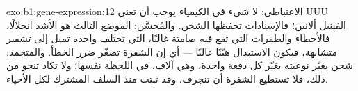 \begin{solution}{exo:b1:gene-expression:12}
الاعتباطي: لا شيء في الكيمياء يوجب أن تعني UUU الفينيل ألانين؛
فالإسنادات  تحفظها  الشحن. والمُحسَّن: الموضع الثالث هو
الأشد انحلالًا، فالأخطاء والطفرات التي تقع فيه صامتة غالبًا،
 التي تختلف  واحدة تميل إلى تشفير 
متشابهة، فيكون الاستبدال هيّنًا غالبًا --- أي إن الشفرة تصغّر ضرر
الخطأ. والمتجمد:  شحن يغيّر نوعيته يغيّر كل  
دفعة واحدة، وهي آلاف، في اللحظة نفسها؛ ولا تكاد  تنجو من ذلك،
فلا تستطيع الشفرة أن تنجرف، وقد ثبتت منذ السلف المشترك لكل الأحياء.
\end{solution}

